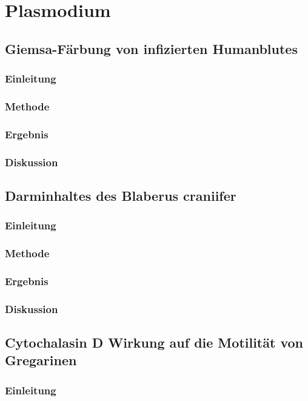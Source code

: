 \documentclass[oneside,10pt,a4paper]{report}
\begin{document}
		
	
	\chapter{Plasmodium}
		\section{Giemsa-Färbung von infizierten Humanblutes}
			\subsection{Einleitung}
			\subsection{Methode}
			\subsection{Ergebnis}
			\subsection{Diskussion}
	
		\section{Darminhaltes des Blaberus craniifer}
			\subsection{Einleitung}
			\subsection{Methode}
			\subsection{Ergebnis}
			\subsection{Diskussion}
		
		\section{Cytochalasin D Wirkung auf die Motilität von Gregarinen}
			\subsection{Einleitung}
\end{document}
